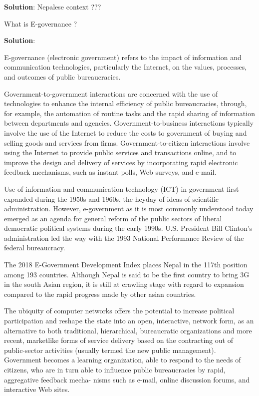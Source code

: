 \documentclass[
  openany]{book}
\newcommand{\question}{\item}
\newenvironment{solution}{ {\bfseries Solution}:}{}
\begin{document}
\begin{questions}
\begin{solution}
Nepalese context ???

\end{solution}

\question What is E-governance ?

\begin{solution}

E-governance (electronic government) refers to the impact of information and communication technologies, particularly the Internet, on the values, processes, and outcomes of public bureaucracies.

Government-to-government interactions are concerned with the use of technologies to enhance the internal efficiency of public bureaucracies, through, for example, the automation of routine tasks and the rapid sharing of information between departments and agencies. Government-to-business interactions typically involve the use of the Internet to reduce the costs to government of buying and selling goods and services from firms. Government-to-citizen interactions involve using the Internet to provide public services and transactions online, and to improve the design and delivery of services by incorporating rapid electronic feedback mechanisms, such as instant polls, Web surveys, and e-mail.

Use of information and communication technology (ICT) in government first expanded during the 1950s and 1960s, the heyday of ideas of scientific administration. However, e-government as it is most commonly understood today emerged as an agenda for general reform of the public sectors of liberal democratic political systems during the early 1990s. U.S. President Bill Clinton's administration led the way with the 1993 National Performance Review of the federal bureaucracy.

The 2018 E-Government Development Index places Nepal in the 117th position among 193 countries. Although Nepal is said to be the first country to bring 3G in the south Asian region, it is still at crawling stage with regard to expansion compared to the rapid progress made by other asian countries.

The ubiquity of computer networks offers the potential to increase political participation and reshape the state into an open, interactive, network form, as an alternative to both traditional, hierarchical, bureaucratic organizations and more recent, marketlike forms of service delivery based on the contracting out of public-sector activities (usually termed the new public management). Government becomes a learning organization, able to respond to the needs of citizens, who are in turn able to influence public bureaucracies by rapid, aggregative feedback mecha- nisms such as e-mail, online discussion forums, and interactive Web sites.


\end{solution}
\end{questions}
\end{document}
